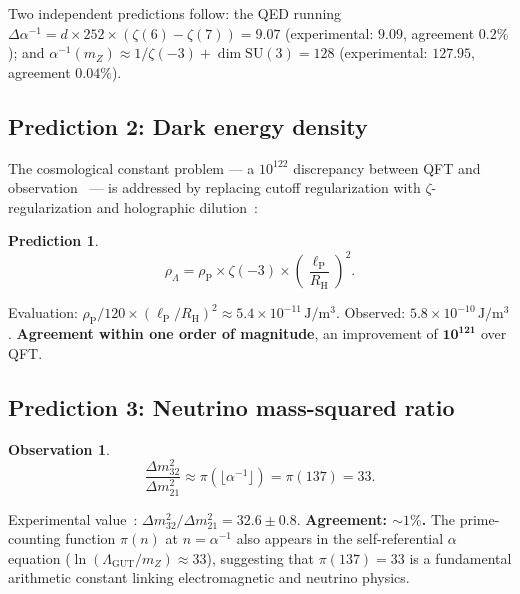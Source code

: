 \documentclass[11pt,a4paper]{article}
\newtheorem{observation}[theorem]{Observation}
\newtheorem{prediction}[theorem]{Prediction}
\newcommand{\lP}{\ell_{\mathrm{P}}}
\newcommand{\RH}{R_{\mathrm{H}}}
\newcommand{\rhoP}{\rho_{\mathrm{P}}}
\begin{document}
Two independent predictions follow: the QED running
$\Delta\alpha^{-1} = d \times 252 \times (\zeta(6)-\zeta(7)) = 9.07$
(experimental: $9.09$, agreement $0.2\%$); and
$\alpha^{-1}(m_Z) \approx 1/\zeta(-3) + \dim\mathrm{SU}(3) = 128$
(experimental: $127.95$, agreement $0.04\%$).

\subsection{Prediction 2: Dark energy density}

The cosmological constant problem --- a $10^{122}$ discrepancy
between QFT and observation~\cite{Weinberg1989} --- is addressed by
replacing cutoff regularization with $\zeta$-regularization and
holographic dilution~\cite{Li2004}:

\begin{prediction}
\label{pred:de}
\begin{equation}
  \rho_\Lambda = \rhoP \times \zeta(-3) \times \left(\frac{\lP}{\RH}\right)^2.
  \label{eq:rho_lambda}
\end{equation}
\end{prediction}

Evaluation: $\rhoP / 120 \times (\lP/\RH)^2
\approx 5.4 \times 10^{-11}\,\mathrm{J/m^3}$.
Observed: $5.8 \times 10^{-10}\,\mathrm{J/m^3}$.
\textbf{Agreement within one order of magnitude}, an improvement
of $\mathbf{10^{121}}$ over QFT.

\subsection{Prediction 3: Neutrino mass-squared ratio}

\begin{observation}
\label{obs:nu}
\begin{equation}
  \frac{\Delta m^2_{32}}{\Delta m^2_{21}} \approx \pi(\lfloor\alpha^{-1}\rfloor)
  = \pi(137) = 33.
  \label{eq:nu}
\end{equation}
\end{observation}

Experimental value~\cite{Esteban2020}:
$\Delta m^2_{32}/\Delta m^2_{21} = 32.6 \pm 0.8$.
\textbf{Agreement: $\sim 1\%$.}
The prime-counting function $\pi(n)$ at $n = \alpha^{-1}$ also
appears in the self-referential $\alpha$ equation
($\ln(\Lambda_{\mathrm{GUT}}/m_Z) \approx 33$), suggesting that
$\pi(137) = 33$ is a fundamental arithmetic constant linking
electromagnetic and neutrino physics.
\end{document}
